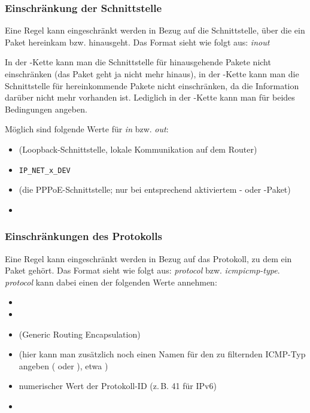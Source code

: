 \subsubsection{Einschränkung der Schnittstelle}

Eine Regel kann eingeschränkt werden in Bezug auf die Schnittstelle, über die
ein Paket hereinkam bzw. hinausgeht. Das Format sieht wie folgt aus:
\emph{in}\fwmatch{:}\emph{out}

In der -Kette kann man die Schnittstelle für hinausgehende
Pakete nicht einschränken (das Paket geht ja nicht mehr hinaus), in der
-Kette kann man die Schnittstelle für hereinkommende
Pakete nicht einschränken, da die Information darüber nicht mehr vorhanden ist.
Lediglich in der -Kette kann man für beides Bedingungen
angeben.

Möglich sind folgende Werte für \emph{in} bzw. \emph{out}:

\begin{itemize}
  \item {} (Loopback-Schnittstelle, lokale Kommunikation auf dem
    Router)
  \item \verb+IP_NET_x_DEV+
  \item {} (die PPPoE-Schnittstelle; nur bei entsprechend
    aktiviertem - oder -Paket)
  \item {}
\end{itemize}

\subsubsection{Einschränkungen des Protokolls}

Eine Regel kann eingeschränkt werden in Bezug auf das Protokoll, zu dem ein
Paket gehört. Das Format sieht wie folgt aus:
\emph{protocol} bzw. \emph{icmp}\fwmatch{:}\emph{icmp-type}.
\emph{protocol} kann dabei einen der folgenden Werte annehmen:

\begin{itemize}
  \item {}
  \item {}
  \item {} (Generic Routing Encapsulation)
  \item {} (hier kann man zusätzlich noch einen Namen für den
    zu filternden ICMP-Typ angeben ( oder
    ), etwa )
  \item numerischer Wert der Protokoll-ID (z.\,B. 41 für IPv6)
  \item {}
\end{itemize}

